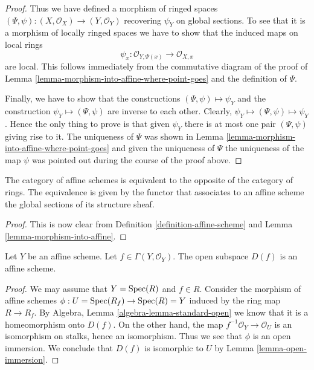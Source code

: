 \begin{proof}
\medskip\noindent
Thus we have defined a morphism of ringed spaces
$(\Psi, \psi) : (X, \mathcal{O}_X) \to (Y, \mathcal{O}_Y)$
recovering $\psi_Y$ on global sections. To see that it is
a morphism of locally ringed spaces we have to show that
the induced maps on local rings
$$
\psi_x : \mathcal{O}_{Y, \Psi(x)} \longrightarrow \mathcal{O}_{X, x}
$$
are local. This follows immediately from the commutative diagram
of the proof of Lemma \ref{lemma-morphism-into-affine-where-point-goes}
and the definition of $\Psi$.

\medskip\noindent
Finally, we have to show that the constructions
$(\Psi, \psi) \mapsto \psi_Y$ and the construction
$\psi_Y \mapsto (\Psi, \psi)$ are inverse to each other.
Clearly, $\psi_Y \mapsto (\Psi, \psi) \mapsto \psi_Y$.
Hence the only thing to prove is that given $\psi_Y$
there is at most one pair $(\Psi, \psi)$ giving rise
to it. The uniqueness of $\Psi$ was shown in Lemma
\ref{lemma-morphism-into-affine-where-point-goes} and
given the uniqueness of $\Psi$ the uniqueness of the
map $\psi$ was pointed out during the course of the proof
above.
\end{proof}

\begin{lemma}
\label{lemma-category-affine-schemes}
The category of affine schemes is equivalent to the opposite of the
category of rings. The equivalence is given by the functor that associates
to an affine scheme the global sections of its structure sheaf.
\end{lemma}

\begin{proof}
This is now clear from Definition \ref{definition-affine-scheme}
and Lemma \ref{lemma-morphism-into-affine}.
\end{proof}

\begin{lemma}
\label{lemma-standard-open-affine}
Let $Y$ be an affine scheme.
Let $f \in \Gamma(Y, \mathcal{O}_Y)$.
The open subspace $D(f)$ is an affine scheme.
\end{lemma}

\begin{proof}
We may assume that $Y = \mathop{\rm Spec}(R)$ and $f \in R$.
Consider the morphism of affine schemes
$\phi : U = \mathop{\rm Spec}(R_f) \to \mathop{\rm Spec}(R) = Y$ induced by the ring
map $R \to R_f$. By Algebra, Lemma \ref{algebra-lemma-standard-open}
we know that it is a homeomorphism onto $D(f)$.
On the other hand, the map $f^{-1}\mathcal{O}_Y \to \mathcal{O}_U$
is an isomorphism on stalks, hence an isomorphism. Thus we see
that $\phi$ is an open immersion. We conclude that $D(f)$
is isomorphic to $U$ by Lemma \ref{lemma-open-immersion}.
\end{proof}

